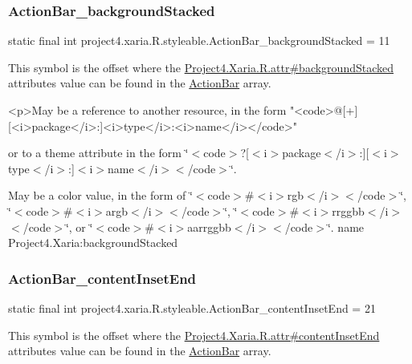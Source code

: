 \subsubsection{\texorpdfstring{Action\+Bar\+\_\+background\+Stacked}{ActionBar\_backgroundStacked}}
{\footnotesize\ttfamily static final int project4.\+xaria.\+R.\+styleable.\+Action\+Bar\+\_\+background\+Stacked = 11\hspace{0.3cm}{\ttfamily [static]}}

This symbol is the offset where the \hyperlink{}{Project4.\+Xaria.\+R.\+attr\#background\+Stacked} attribute\textquotesingle{}s value can be found in the \hyperlink{classproject4_1_1xaria_1_1R_1_1styleable_accb530194c58ee3abb15587da8869e99}{Action\+Bar} array.

\begin{DoxyVerb}      <p>May be a reference to another resource, in the form "<code>@[+][<i>package</i>:]<i>type</i>:<i>name</i></code>"
\end{DoxyVerb}
 or to a theme attribute in the form \char`\"{}$<$code$>$?\mbox{[}$<$i$>$package$<$/i$>$\+:\mbox{]}\mbox{[}$<$i$>$type$<$/i$>$\+:\mbox{]}$<$i$>$name$<$/i$>$$<$/code$>$\char`\"{}. 

May be a color value, in the form of \char`\"{}$<$code$>$\#$<$i$>$rgb$<$/i$>$$<$/code$>$\char`\"{}, \char`\"{}$<$code$>$\#$<$i$>$argb$<$/i$>$$<$/code$>$\char`\"{}, \char`\"{}$<$code$>$\#$<$i$>$rrggbb$<$/i$>$$<$/code$>$\char`\"{}, or \char`\"{}$<$code$>$\#$<$i$>$aarrggbb$<$/i$>$$<$/code$>$\char`\"{}.  name Project4.\+Xaria\+:background\+Stacked \mbox{\label{classproject4_1_1xaria_1_1R_1_1styleable_a89330126d297ac16f0e2a9dcfeaad358}} 
\subsubsection{\texorpdfstring{Action\+Bar\+\_\+content\+Inset\+End}{ActionBar\_contentInsetEnd}}
{\footnotesize\ttfamily static final int project4.\+xaria.\+R.\+styleable.\+Action\+Bar\+\_\+content\+Inset\+End = 21\hspace{0.3cm}{\ttfamily [static]}}

This symbol is the offset where the \hyperlink{}{Project4.\+Xaria.\+R.\+attr\#content\+Inset\+End} attribute\textquotesingle{}s value can be found in the \hyperlink{classproject4_1_1xaria_1_1R_1_1styleable_accb530194c58ee3abb15587da8869e99}{Action\+Bar} array.

